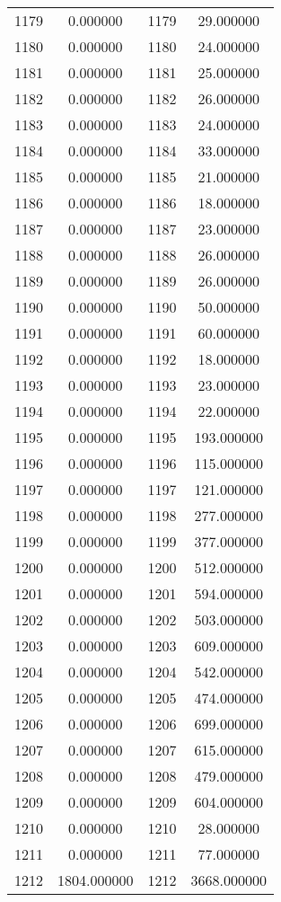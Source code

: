\documentclass[12pt]{article}
\begin{document}
\begin{longtable}{@{}cccc@{}}
1179 & 0.000000 & 1179 & 29.000000 \\
1180 & 0.000000 & 1180 & 24.000000 \\
1181 & 0.000000 & 1181 & 25.000000 \\
1182 & 0.000000 & 1182 & 26.000000 \\
1183 & 0.000000 & 1183 & 24.000000 \\
1184 & 0.000000 & 1184 & 33.000000 \\
1185 & 0.000000 & 1185 & 21.000000 \\
1186 & 0.000000 & 1186 & 18.000000 \\
1187 & 0.000000 & 1187 & 23.000000 \\
1188 & 0.000000 & 1188 & 26.000000 \\
1189 & 0.000000 & 1189 & 26.000000 \\
1190 & 0.000000 & 1190 & 50.000000 \\
1191 & 0.000000 & 1191 & 60.000000 \\
1192 & 0.000000 & 1192 & 18.000000 \\
1193 & 0.000000 & 1193 & 23.000000 \\
1194 & 0.000000 & 1194 & 22.000000 \\
1195 & 0.000000 & 1195 & 193.000000 \\
1196 & 0.000000 & 1196 & 115.000000 \\
1197 & 0.000000 & 1197 & 121.000000 \\
1198 & 0.000000 & 1198 & 277.000000 \\
1199 & 0.000000 & 1199 & 377.000000 \\
1200 & 0.000000 & 1200 & 512.000000 \\
1201 & 0.000000 & 1201 & 594.000000 \\
1202 & 0.000000 & 1202 & 503.000000 \\
1203 & 0.000000 & 1203 & 609.000000 \\
1204 & 0.000000 & 1204 & 542.000000 \\
1205 & 0.000000 & 1205 & 474.000000 \\
1206 & 0.000000 & 1206 & 699.000000 \\
1207 & 0.000000 & 1207 & 615.000000 \\
1208 & 0.000000 & 1208 & 479.000000 \\
1209 & 0.000000 & 1209 & 604.000000 \\
1210 & 0.000000 & 1210 & 28.000000 \\
1211 & 0.000000 & 1211 & 77.000000 \\
1212 & 1804.000000 & 1212 & 3668.000000 \\

\end{longtable}
\end{document}
